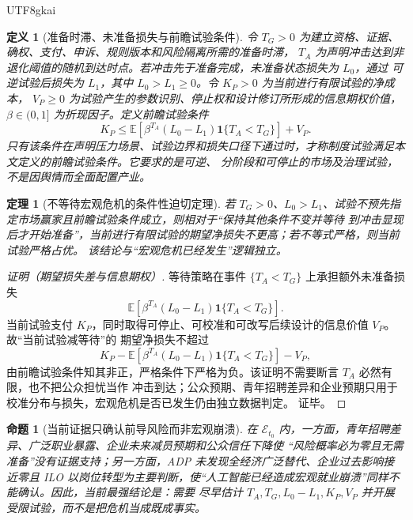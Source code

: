 \documentclass[12pt,a4paper,openany]{report}
\newtheorem{definition}{定义}[chapter]
\newtheorem{theorem}{定理}[chapter]
\newtheorem{proposition}{命题}[chapter]
\newcommand{\EE}{\mathbb E}
\begin{document}
\begin{CJK*}{UTF8}{gkai}
\begin{definition}[准备时滞、未准备损失与前瞻试验条件]
令 \(T_G>0\) 为建立资格、证据、确权、支付、申诉、规则版本和风险隔离所需的准备时滞，
\(T_A\) 为声明冲击达到非退化阈值的随机到达时点。若冲击先于准备完成，未准备状态损失为 \(L_0\)，通过
可逆试验后损失为 \(L_1\)，其中 \(L_0>L_1\ge0\)。令 \(K_P>0\) 为当前进行有限试验的净成本，
\(V_P\ge0\) 为试验产生的参数识别、停止权和设计修订所形成的信息期权价值，
\(\beta\in(0,1]\) 为折现因子。定义前瞻试验条件
\[
  K_P
  \le
  \EE\!\left[
    \beta^{T_A}(L_0-L_1)
    \mathbf 1\{T_A<T_G\}
  \right]
  +V_P.
\]
只有该条件在声明压力场景、试验边界和损失口径下通过时，才称制度试验满足本文定义的前瞻试验条件。它要求的是可逆、
分阶段和可停止的市场及治理试验，不是因舆情而全面配置产业。
\end{definition}

\begin{theorem}[不等待宏观危机的条件性迫切定理]
\label{thm:conditional-anticipatory-urgency}
若 \(T_G>0\)、\(L_0>L_1\)、试验不预先指定市场赢家且前瞻试验条件成立，则相对于“保持其他条件不变并等待
到冲击显现后才开始准备”，当前进行有限试验的期望净损失不更高；若不等式严格，则当前试验严格占优。
该结论与“宏观危机已经发生”逻辑独立。
\end{theorem}

\begin{proof}[证明（期望损失差与信息期权）]
等待策略在事件 \(\{T_A<T_G\}\) 上承担额外未准备损失
\[
  \EE\!\left[
    \beta^{T_A}(L_0-L_1)\mathbf 1\{T_A<T_G\}
  \right].
\]
当前试验支付 \(K_P\)，同时取得可停止、可校准和可改写后续设计的信息价值 \(V_P\)。故“当前试验减等待”的
期望净损失不超过
\[
  K_P
  -\EE\!\left[
    \beta^{T_A}(L_0-L_1)\mathbf 1\{T_A<T_G\}
  \right]
  -V_P,
\]
由前瞻试验条件知其非正，严格条件下严格为负。该证明不需要断言 \(T_A\) 必然有限，也不把公众担忧当作
冲击到达；公众预期、青年招聘差异和企业预期只用于校准分布与损失，宏观危机是否已发生仍由独立数据判定。
证毕。
\end{proof}

\begin{proposition}[当前证据只确认前导风险而非宏观崩溃]
\label{prop:leading-risk-not-collapse}
在 \(\mathcal E_{t_0}\) 内，一方面，青年招聘差异、广泛职业暴露、企业未来减员预期和公众信任下降使
“风险概率必为零且无需准备”没有证据支持；另一方面，ADP 未发现全经济广泛替代、企业过去影响接近零且
ILO 以岗位转型为主要判断，使“人工智能已经造成宏观就业崩溃”同样不能确认。因此，当前最强结论是：需要
尽早估计 \(T_A,T_G,L_0-L_1,K_P,V_P\) 并开展受限试验，而不是把危机当成既成事实。
\end{proposition}


\end{CJK*}
\end{document}
